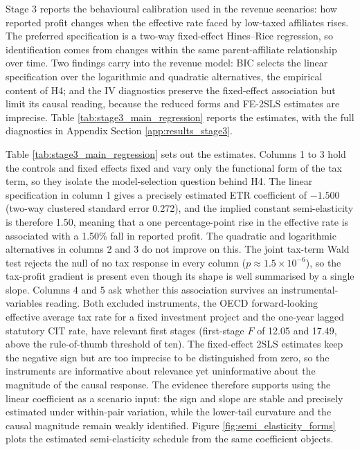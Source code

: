 \documentclass[11pt,a4paper]{article}
\begin{document}
Stage 3 reports the behavioural calibration used in the revenue scenarios: how reported profit changes when the effective rate faced by low-taxed affiliates rises. The preferred specification is a two-way fixed-effect Hines--Rice regression, so identification comes from changes within the same parent-affiliate relationship over time. Two findings carry into the revenue model: BIC selects the linear specification over the logarithmic and quadratic alternatives, the empirical content of H4; and the IV diagnostics preserve the fixed-effect association but limit its causal reading, because the reduced forms and FE-2SLS estimates are imprecise. Table \ref{tab:stage3_main_regression} reports the estimates, with the full diagnostics in Appendix Section \ref{app:results_stage3}.



Table \ref{tab:stage3_main_regression} sets out the estimates. Columns 1 to 3 hold the controls and fixed effects fixed and vary only the functional form of the tax term, so they isolate the model-selection question behind H4. The linear specification in column 1 gives a precisely estimated ETR coefficient of $-1.500$ (two-way clustered standard error 0.272), and the implied constant semi-elasticity is therefore 1.50, meaning that a one percentage-point rise in the effective rate is associated with a 1.50\% fall in reported profit. The quadratic and logarithmic alternatives in columns 2 and 3 do not improve on this. The joint tax-term Wald test rejects the null of no tax response in every column ($p \approx 1.5 \times 10^{-6}$), so the tax-profit gradient is present even though its shape is well summarised by a single slope. Columns 4 and 5 ask whether this association survives an instrumental-variables reading. Both excluded instruments, the OECD forward-looking effective average tax rate for a fixed investment project and the one-year lagged statutory CIT rate, have relevant first stages (first-stage $F$ of 12.05 and 17.49, above the rule-of-thumb threshold of ten). The fixed-effect 2SLS estimates keep the negative sign but are too imprecise to be distinguished from zero, so the instruments are informative about relevance yet uninformative about the magnitude of the causal response. The evidence therefore supports using the linear coefficient as a scenario input: the sign and slope are stable and precisely estimated under within-pair variation, while the lower-tail curvature and the causal magnitude remain weakly identified. Figure \ref{fig:semi_elasticity_forms} plots the estimated semi-elasticity schedule from the same coefficient objects. 
\end{document}
